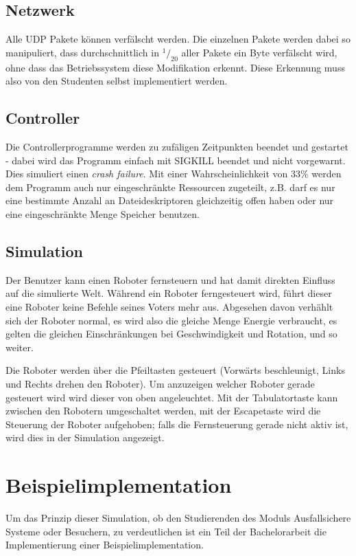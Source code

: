 \documentclass[
    12pt,
    bibliography=totoc,
    ngerman,
    enabledeprecatedfontcommands
]{scrartcl}
\begin{document}

\subsection{Netzwerk}
Alle UDP Pakete k{\"{o}}nnen verf{\"{a}}lscht werden. Die einzelnen Pakete werden dabei so manipuliert, dass durchschnittlich in $ ^1/_{20} $ aller Pakete
ein Byte verf{\"{a}}lscht wird, ohne dass das Betriebssystem diese Modifikation erkennt. Diese Erkennung muss also von den Studenten selbst implementiert werden.

\subsection{Controller}
Die Controllerprogramme werden zu zuf{\"{a}}ligen Zeitpunkten beendet und gestartet - dabei wird das Programm einfach mit SIGKILL beendet und nicht vorgewarnt. Dies simuliert einen \textit{crash failure}. Mit einer Wahrscheinlichkeit von 33\% werden dem Programm auch nur eingeschr{\"{a}}nkte Ressourcen zugeteilt, z.B. darf es nur eine bestimmte Anzahl an Dateideskriptoren gleichzeitig
offen haben oder nur eine eingeschr{\"{a}}nkte Menge Speicher benutzen.


\subsection{Simulation}
Der Benutzer kann einen Roboter fernsteuern und hat damit direkten Einfluss auf die simulierte Welt. W{\"{a}}hrend ein Roboter
ferngesteuert wird, f{\"{u}}hrt dieser eine Roboter keine Befehle seines Voters mehr aus. Abgesehen davon verh{\"{a}}hlt sich der Roboter normal, es wird also die gleiche Menge Energie verbraucht, es gelten die gleichen Einschr{\"{a}}nkungen bei
Geschwindigkeit und Rotation, und so weiter.

Die Roboter werden {\"{u}}ber die Pfeiltasten gesteuert (Vorw{\"{a}}rts beschleunigt, Links und Rechts drehen den Roboter). Um
anzuzeigen welcher Roboter gerade gesteuert wird wird dieser von oben angeleuchtet. Mit der Tabulatortaste kann zwischen den
Robotern umgeschaltet werden, mit der Escapetaste wird die Steuerung der Roboter aufgehoben; falls die Fernsteuerung gerade nicht aktiv ist, wird dies in der Simulation angezeigt.

\clearpage
\section{Beispielimplementation}
Um das Prinzip dieser Simulation, ob den Studierenden des Moduls Ausfallsichere Systeme oder Besuchern, zu verdeutlichen ist ein Teil der Bachelorarbeit die Implementierung einer
Beispielimplementation.
\end{document}
